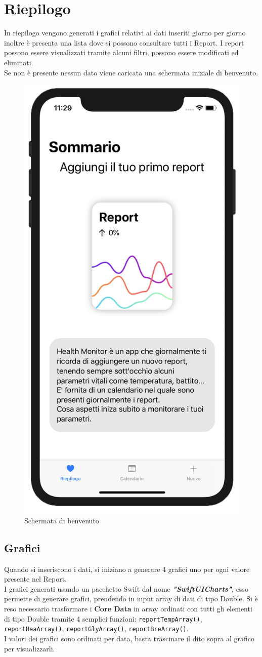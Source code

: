 \documentclass{article}
\begin{document}

\newpage
\section{Riepilogo}

In riepilogo vengono generati i grafici relativi ai dati inseriti giorno per giorno inoltre è presenta una lista dove si possono consultare tutti i Report. I report possono essere visualizzati tramite alcuni filtri, possono essere modificati ed eliminati.\\
Se non è presente nessun dato viene caricata una schermata iniziale di benvenuto. 

\begin{figure}[htp]

\centering
\includegraphics[width=.3\textwidth]{img/riepilogo_iniziale.png}

\caption{Schermata di benvenuto}
\label{fig:figure3}
\end{figure}

\subsection{Grafici}

Quando si inseriscono i dati, si iniziano a generare 4 grafici uno per ogni valore presente nel Report.\\
I grafici generati usando un pacchetto Swift dal nome \textbf{\textit{"SwiftUICharts"}}, esso permette di generare grafici, prendendo in input array di dati di tipo Double. Si è reso necessario trasformare i \textbf{Core Data} in array ordinati con tutti gli elementi di tipo Double tramite 4 semplici funzioni: \texttt{reportTempArray()}, \texttt{reportHeaArray()}, \texttt{reportGlyArray()}, \texttt{reportBreArray()}.\\
I valori dei grafici sono ordinati per data, basta trascinare il dito sopra al grafico per visualizzarli. 
\end{document}
